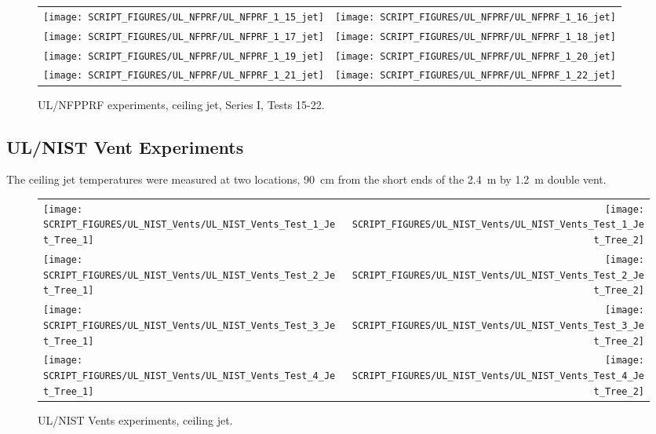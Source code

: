 \begin{figure}[p]
\begin{tabular*}{\textwidth}{l@{\extracolsep{\fill}}r}
\texttt{[image: SCRIPT\_FIGURES/UL\_NFPRF/UL\_NFPRF\_1\_15\_jet]} &
\texttt{[image: SCRIPT\_FIGURES/UL\_NFPRF/UL\_NFPRF\_1\_16\_jet]} \\
\texttt{[image: SCRIPT\_FIGURES/UL\_NFPRF/UL\_NFPRF\_1\_17\_jet]} &
\texttt{[image: SCRIPT\_FIGURES/UL\_NFPRF/UL\_NFPRF\_1\_18\_jet]} \\
\texttt{[image: SCRIPT\_FIGURES/UL\_NFPRF/UL\_NFPRF\_1\_19\_jet]} &
\texttt{[image: SCRIPT\_FIGURES/UL\_NFPRF/UL\_NFPRF\_1\_20\_jet]} \\
\texttt{[image: SCRIPT\_FIGURES/UL\_NFPRF/UL\_NFPRF\_1\_21\_jet]} &
\texttt{[image: SCRIPT\_FIGURES/UL\_NFPRF/UL\_NFPRF\_1\_22\_jet]}
\end{tabular*}
\caption{UL/NFPPRF experiments, ceiling jet, Series I, Tests 15-22.}
\label{UL_NFPRF_jet_3}
\end{figure}


\clearpage

\subsection{UL/NIST Vent Experiments}

The ceiling jet temperatures were measured at two locations, 90~cm from the short ends of the 2.4~m by 1.2~m double vent.

\newpage

\begin{figure}[p]
\begin{tabular*}{\textwidth}{l@{\extracolsep{\fill}}r}
\texttt{[image: SCRIPT\_FIGURES/UL\_NIST\_Vents/UL\_NIST\_Vents\_Test\_1\_Jet\_Tree\_1]} &
\texttt{[image: SCRIPT\_FIGURES/UL\_NIST\_Vents/UL\_NIST\_Vents\_Test\_1\_Jet\_Tree\_2]} \\
\texttt{[image: SCRIPT\_FIGURES/UL\_NIST\_Vents/UL\_NIST\_Vents\_Test\_2\_Jet\_Tree\_1]} &
\texttt{[image: SCRIPT\_FIGURES/UL\_NIST\_Vents/UL\_NIST\_Vents\_Test\_2\_Jet\_Tree\_2]} \\
\texttt{[image: SCRIPT\_FIGURES/UL\_NIST\_Vents/UL\_NIST\_Vents\_Test\_3\_Jet\_Tree\_1]} &
\texttt{[image: SCRIPT\_FIGURES/UL\_NIST\_Vents/UL\_NIST\_Vents\_Test\_3\_Jet\_Tree\_2]} \\
\texttt{[image: SCRIPT\_FIGURES/UL\_NIST\_Vents/UL\_NIST\_Vents\_Test\_4\_Jet\_Tree\_1]} &
\texttt{[image: SCRIPT\_FIGURES/UL\_NIST\_Vents/UL\_NIST\_Vents\_Test\_4\_Jet\_Tree\_2]}
\end{tabular*}
\caption{UL/NIST Vents experiments, ceiling jet.}
\label{UL_NIST_Ceiling_Jet}
\end{figure}


